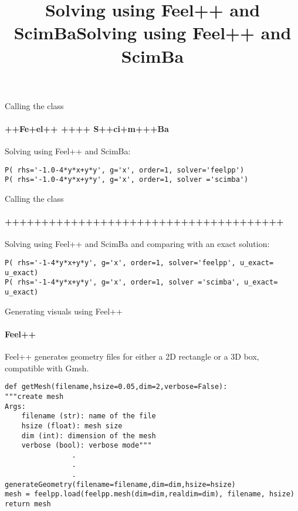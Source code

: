 \documentclass{beamer}
\begin{document}
\begin{frame}[fragile]{Calling the class}
\framesubtitle{++Fe+el++ ++++ S++ci+m+++Ba}

\title{Solving using Feel++ and ScimBa}
Solving using Feel++ and ScimBa:
\begin{lstlisting}
P( rhs='-1.0-4*y*x+y*y', g='x', order=1, solver='feelpp')
P( rhs='-1.0-4*y*x+y*y', g='x', order=1, solver ='scimba')
\end{lstlisting}
\end{frame}

\begin{frame}[fragile]{Calling the class}
\framesubtitle{++++++++++++++++++++++++++++++++++++++}

\title{Solving using Feel++ and ScimBa}
Solving using Feel++ and ScimBa and comparing with an exact solution:
\begin{lstlisting}
P( rhs='-1-4*y*x+y*y', g='x', order=1, solver='feelpp', u_exact= u_exact)
P( rhs='-1-4*y*x+y*y', g='x', order=1, solver ='scimba', u_exact= u_exact)
\end{lstlisting}
\end{frame}


\begin{frame}[plain]
\begin{center}
\end{center}

\end{frame}

\begin{frame}[fragile]{Generating visuals using Feel++}
\framesubtitle{Feel++}

Feel++ generates geometry files for either a 2D rectangle or a 3D box, compatible with Gmsh.
\begin{lstlisting}
def getMesh(filename,hsize=0.05,dim=2,verbose=False):
"""create mesh
Args:
    filename (str): name of the file
    hsize (float): mesh size
    dim (int): dimension of the mesh
    verbose (bool): verbose mode"""
                .
                .
                .
generateGeometry(filename=filename,dim=dim,hsize=hsize)
mesh = feelpp.load(feelpp.mesh(dim=dim,realdim=dim), filename, hsize)
return mesh
\end{lstlisting}

\end{frame}
\end{document}
